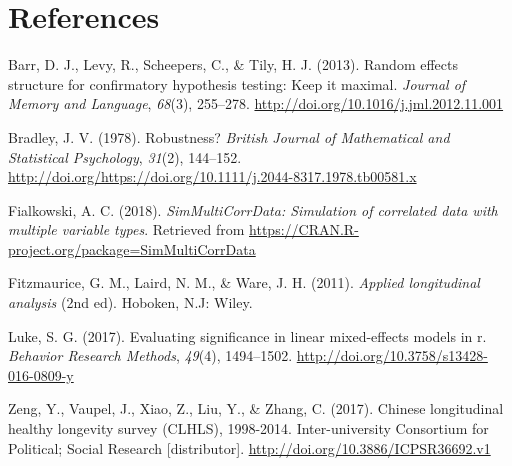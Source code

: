 \documentclass[12pt, twoside]{amherstthesis}
\begin{document}
\backmatter

\hypertarget{references}{%
\chapter*{References}\label{references}}

\noindent

\setlength{\parindent}{-0.20in}
\setlength{\leftskip}{0.20in}
\setlength{\parskip}{8pt}

\hypertarget{refs}{}
\leavevmode\hypertarget{ref-barr_random_2013}{}%
Barr, D. J., Levy, R., Scheepers, C., \& Tily, H. J. (2013). Random effects structure for confirmatory hypothesis testing: Keep it maximal. \emph{Journal of Memory and Language}, \emph{68}(3), 255--278. \url{http://doi.org/10.1016/j.jml.2012.11.001}

\leavevmode\hypertarget{ref-bradley}{}%
Bradley, J. V. (1978). Robustness? \emph{British Journal of Mathematical and Statistical Psychology}, \emph{31}(2), 144--152. \url{http://doi.org/https://doi.org/10.1111/j.2044-8317.1978.tb00581.x}

\leavevmode\hypertarget{ref-Simtest}{}%
Fialkowski, A. C. (2018). \emph{SimMultiCorrData: Simulation of correlated data with multiple variable types}. Retrieved from \url{https://CRAN.R-project.org/package=SimMultiCorrData}

\leavevmode\hypertarget{ref-fitzmaurice_applied_2011}{}%
Fitzmaurice, G. M., Laird, N. M., \& Ware, J. H. (2011). \emph{Applied longitudinal analysis} (2nd ed). Hoboken, N.J: Wiley.

\leavevmode\hypertarget{ref-luke_evaluating_2017}{}%
Luke, S. G. (2017). Evaluating significance in linear mixed-effects models in r. \emph{Behavior Research Methods}, \emph{49}(4), 1494--1502. \url{http://doi.org/10.3758/s13428-016-0809-y}

\leavevmode\hypertarget{ref-zeng_chinese_2017}{}%
Zeng, Y., Vaupel, J., Xiao, Z., Liu, Y., \& Zhang, C. (2017). Chinese longitudinal healthy longevity survey (CLHLS), 1998-2014. Inter-university Consortium for Political; Social Research {[}distributor{]}. \url{http://doi.org/10.3886/ICPSR36692.v1}

\end{document}
